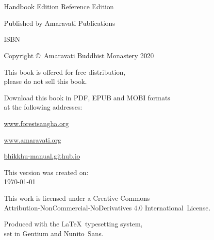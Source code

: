 \cleartoverso
\thispagestyle{empty}

\vspace*{-\baselineskip}

{%

\ifhandbookedition
\fontsize{9}{10}\selectfont
\else
\fontsize{9}{11}\selectfont
\fi
\centering
\setlength{\parindent}{0pt}%
\setlength{\parskip}{0.8\baselineskip}%

\thetitle\\
\thesubtitle\\
\ifhandbookedition
Handbook Edition
\else
Reference Edition
\fi

Published by Amaravati Publications

ISBN \theISBN

Copyright \copyright\ Amaravati Buddhist Monastery 2020

This book is offered for free distribution,\\
please do not sell this book.

Download this book in PDF, EPUB and MOBI formats\\
at the following addresses:

\href{https://forestsangha.org/}{www.forestsangha.org}

\href{https://www.amaravati.org/}{www.amaravati.org}

\href{https://bhikkhu-manual.github.io/}{bhikkhu-manual.github.io}

\vfill

This version was created on:\\
\today

\vfill

This work is licensed under a Creative Commons\\
Attribution-NonCommercial-NoDerivatives 4.0 International~License.

Produced with the \LaTeX\ typesetting system,\\
set in Gentium and Nunito~Sans.

\theEditionInfo

}
